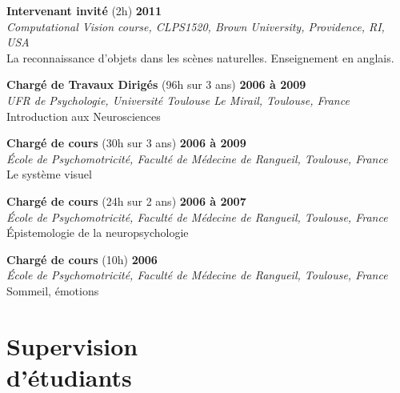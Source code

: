 \documentclass[margin,line]{resume}
\begin{document}
\begin{resume}
\newpage

	\vspace{-2mm} 
	\textbf{Intervenant invité} (2h) \hfill \textbf{2011}\\
	\textsl{Computational Vision course, CLPS1520, Brown University, Providence, RI, USA}\\
	La reconnaissance d'objets dans les scènes naturelles. Enseignement en anglais.

	\vspace{-2mm} 
	\textbf{Chargé de Travaux Dirigés} (96h sur 3 ans) \hfill \textbf{2006 à 2009}\\
	\textsl{UFR de Psychologie, Université Toulouse Le Mirail, Toulouse, France}\\
	Introduction aux Neurosciences	

	\vspace{-2mm} 
	\textbf{Chargé de cours} (30h sur 3 ans) \hfill \textbf{2006 à 2009}\\
	\textsl{\'Ecole de Psychomotricité, Faculté de Médecine de Rangueil, Toulouse, France}\\
	Le système visuel 
	
	\vspace{-2mm} 
	\textbf{Chargé de cours} (24h sur 2 ans) \hfill \textbf{2006 à 2007}\\
	\textsl{\'Ecole de Psychomotricité, Faculté de Médecine de Rangueil, Toulouse, France}\\
	\'Epistemologie de la neuropsychologie

	\vspace{-2mm} 
	\textbf{Chargé de cours} (10h) \hfill \textbf{2006}\\
	\textsl{\'Ecole de Psychomotricité, Faculté de Médecine de Rangueil, Toulouse, France}\\
	Sommeil, émotions


\vspace{3mm}
\section{\mysidestyle Supervision\\d'étudiants}
	

\end{resume}
\end{document}
